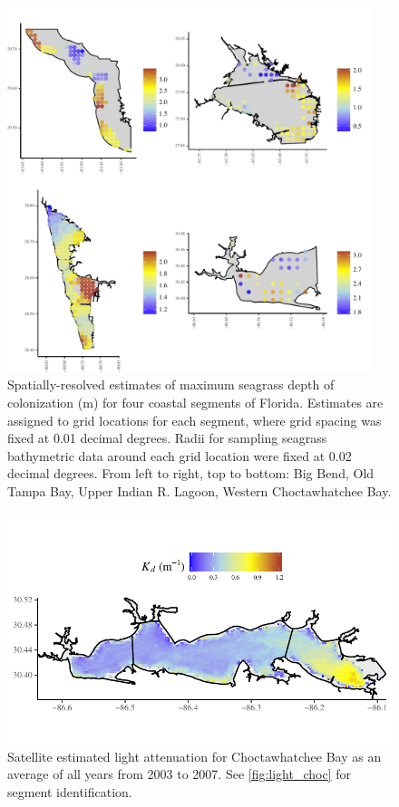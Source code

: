 \documentclass[letterpaper,12pt,oneside]{article}\usepackage[]{graphicx}\usepackage[]{color}
\begin{document}
\begin{figure}
\centering
\includegraphics[width = 0.95\textwidth]{figs/Fig4.pdf}
\caption{Spatially-resolved estimates of maximum seagrass depth of colonization (m) for four coastal segments of Florida.  Estimates are assigned to grid locations for each segment, where grid spacing was fixed at 0.01 decimal degrees.  Radii for sampling seagrass bathymetric data around each grid location were fixed at 0.02 decimal degrees. From left to right, top to bottom: Big Bend, Old Tampa Bay, Upper Indian R. Lagoon, Western Choctawhatchee Bay.}
\label{fig:all_ests}
\end{figure}


\begin{figure}
\centering
\includegraphics[width = \textwidth]{figs/Fig5.pdf}
\caption{Satellite estimated light attenuation for Choctawhatchee Bay as an average of all years from 2003 to 2007.  See \cref{fig:light_choc} for segment identification.}
\label{fig:kd_choc}
\end{figure}
\end{document}
